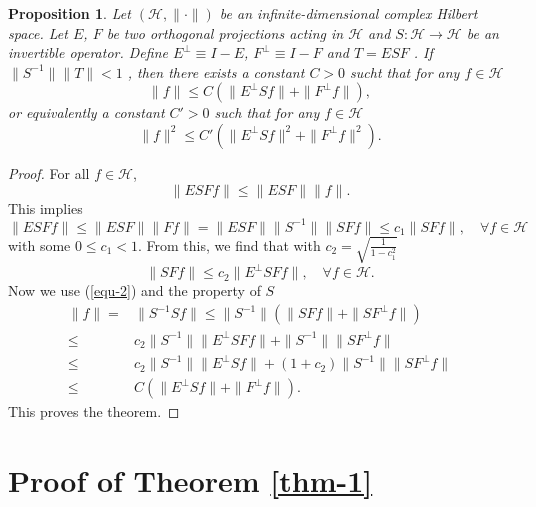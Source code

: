 \documentclass[12pt]{amsart}
\newtheorem{proposition}{Proposition}[section]
\theoremstyle{definition}
\numberwithin{equation}{section}
\begin{document}
\begin{proposition}\label{prop-2}
    Let $(\mathcal{H},\|\cdot\|)$ be an infinite-dimensional complex Hilbert space. Let $E$, $F$ be two orthogonal projections acting in $\mathcal{H}$ and $S:\mathcal{H}\to \mathcal{H}$ be an invertible operator. Define $E^{\perp}\equiv I-E$, $F^{\perp}\equiv I-F$ and $T=ESF$ . If $\|S^{-1}\|\|T\|<1$ , then there exists a constant $C>0$ sucht that for any $f\in \mathcal{H}$  
    \begin{equation}
        \|f\|\le C\left(\|E^{\perp}Sf\|+\|F^{\perp}f\|\right),\label{gen-1}
    \end{equation}      
    or equivalently a constant $C'>0$ such that for any $f\in \mathcal{H}$
    \begin{equation}
        \|f\|^2\le C'\left(\|E^{\perp}Sf\|^2+\|F^{\perp}f\|^2\right).\label{gen-2}
    \end{equation}  
\end{proposition}
\begin{proof}
    For all $f\in \mathcal{H}$,
    $$
        \|ESFf\|\le \|ESF\| \|f\|.
    $$
   This implies
    $$
        \|ESFf\|\le \|ESF\| \| Ff \|=\|ESF\|\|S^{-1}\| \|SFf\| \le c_1 \|SFf\|,\quad \forall f\in \mathcal{H}
    $$
    with some $0\le c_1<1$. 
    From this, we find that with $c_2=\sqrt{\frac{1}{1-c_1^2}}$ 
    \begin{equation}
        \|SFf\|\le c_2 \|E^{\perp}SFf\|,\quad \forall f\in\mathcal{H}.\label{equ-2}
    \end{equation}
    Now we use (\ref{equ-2}) and the property of $S$
     \begin{align*}
         \|f\|=&\|S^{-1}Sf\|\le \|S^{-1}\| (\|SFf\|+\|SF^{\perp}f\|)\\
         \le & c_2 \|S^{-1}\| \|E^{\perp}SFf\|+\|S^{-1}\| \|SF^{\perp}f\|\\
         \le & c_2\|S^{-1}\| \|E^{\perp}Sf\|+(1+c_2)\|S^{-1}\| \|SF^{\perp}f\|\\
         \le & C\left(\|E^{\perp}Sf\|+\|F^{\perp}f\|\right).
     \end{align*}
    This proves the theorem.
\end{proof}



\section{Proof of Theorem \ref{thm-1}}
\end{document}
